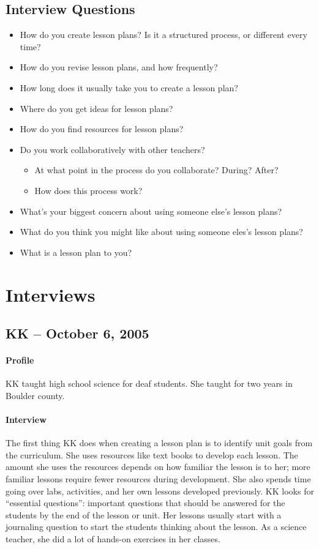 \documentclass[12pt,titlepage]{article}
\begin{document}
\subsection{Interview Questions}
\begin{itemize}
	\item How do you create lesson plans? Is it a structured process, or
		different every time?
	\item How do you revise lesson plans, and how frequently?
	\item How long does it usually take you to create a lesson plan?
	\item Where do you get ideas for lesson plans?
	\item How do you find resources for lesson plans?
	\item Do you work collaboratively with other teachers?
		\begin{itemize}
			\item At what point in the process do you collaborate? During?
				After?
			\item How does this process work?
		\end{itemize}
	\item What's your biggest concern about using someone else's lesson plans?
	\item What do you think you might like about using someone eles's lesson
		plans?
	\item What is a lesson plan to you?
\end{itemize}

\section{Interviews}
\subsection{KK -- October 6, 2005}
\paragraph{Profile} KK taught high school science for deaf students. She taught
for two years in Boulder county.

\paragraph{Interview}The first thing KK does when creating a lesson plan is to
identify unit goals from the curriculum. She uses resources like text books to
develop each lesson. The amount she uses the resources depends on how familiar
the lesson is to her; more familiar lessons require fewer resources during
development. She also spends time going over labs, activities, and her own
lessons developed previously. KK looks for ``essential questions'': important
questions that should be answered for the students by the end of the lesson or
unit. Her lessons usually start with a journaling question to start the students
thinking about the lesson. As a science teacher, she did a lot of hands-on
exercises in her classes.
\end{document}
